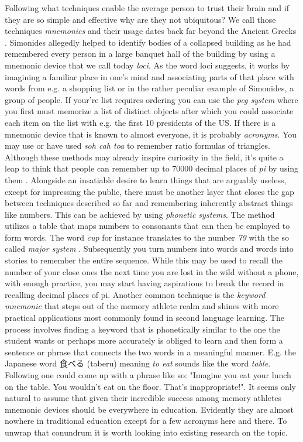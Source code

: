 Following what techniques enable the average person to trust their brain and if they are so simple and effective why are they not ubiquitous? We call those techniques \emph{mnemonics} and their usage dates back far beyond the Ancient Greeks \cite{white_2014}. Simonides allegedly helped to identify bodies of a collapsed building as he had remembered every person in a large banquet hall of the building by using a mnemonic device that we call today \emph{loci}. As the word loci suggests, it works by imagining a familiar place in one's mind and associating parts of that place with words from e.g. a shopping list or in the rather peculiar example of Simonides, a group of people. If your're list requires ordering you can use the \emph{peg system} where you first must memorize a list of distinct objects after which you could associate each item on the list with e.g. the first 10 presidents of the US. If there is a mnemonic device that is known to almost everyone, it is probably \emph{acronyms}. You may use or have used \emph{soh cah toa} to remember ratio formulas of triangles. Although these methods may already inspire curiosity in the field, it's quite a leap to think that people can remember up to 70000 decimal places of \emph{pi} by using them \cite{record_decimal_pi}. Alongside an insatiable desire to learn things that are arguably useless, except for impressing the public, there must be another layer that closes the gap between techniques described so far and remembering inherently abstract things like numbers. This can be achieved by using \emph{phonetic systems}. The method utilizes a table that maps numbers to consonants that can then be employed to form words. The word \emph{cup} for instance translates to the number \emph{79} with the so called \emph{major system} \cite{major_system}. Subsequently you turn numbers into words and words into stories to remember the entire sequence. While this may be used to recall the number of your close ones the next time you are lost in the wild without a phone, with enough practice, you may start having aspirations to break the record in recalling decimal places of pi. Another common technique is the \emph{keyword mnemonic} that steps out of the memory athlete realm and shines with more practical applications most commonly found in second language learning. The process involves finding a keyword that is phonetically similar to the one the student wants or perhaps more accurately is obliged to learn and then form a sentence or phrase that connects the two words in a meaningful manner. E.g. the Japanese word 食べる (taberu) meaning \emph{to eat} sounds like the word \emph{table}. Following one could come up with a phrase like so: "Imagine you eat your lunch on the table. You wouldn't eat on the floor. That's inappropriate!". It seems only natural to assume that given their incredible success among memory athletes mnemonic devices should be everywhere in education. Evidently they are almost nowhere in traditional education except for a few acronyms here and there. To unwrap that conundrum it is worth looking into existing research on the topic.

